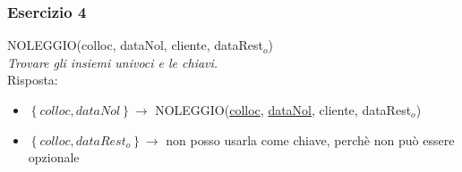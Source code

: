 \documentclass[12pt]{article}
\begin{document}
\subsubsection{Esercizio 4}
NOLEGGIO(colloc, dataNol, cliente, dataRest\(_{o}\))\\
\textit{Trovare gli insiemi univoci e le chiavi.}\\
Risposta:
\begin{itemize}
    \setlength\itemsep{0em}
    \item \(\left\{colloc, dataNol\right\} \rightarrow\) NOLEGGIO(\uline{colloc}, \uline{dataNol}, cliente, dataRest\(_{o}\))
    \item \(\left\{colloc, dataRest_{o}\right\} \rightarrow\) non posso usarla come chiave, perchè non può essere opzionale
\end{itemize}
\end{document}
